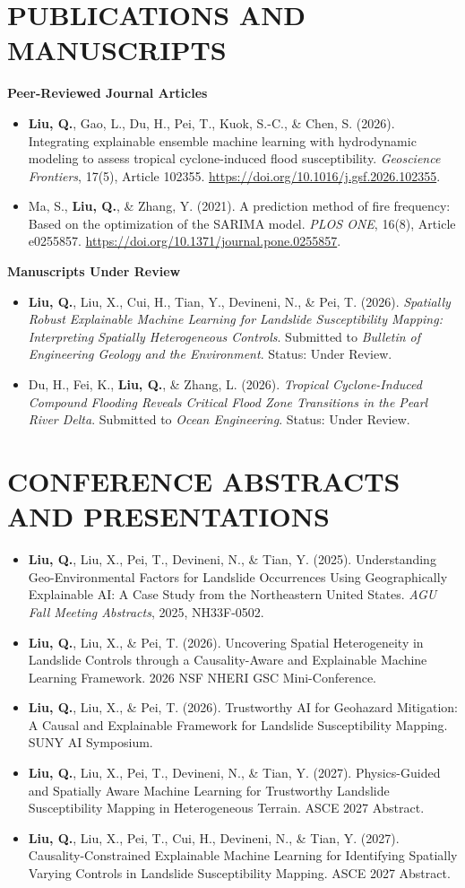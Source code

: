 \documentclass[10pt,letterpaper]{article}
\newcommand{\publication}[1]{\item \justifying #1}
\begin{document}
\section*{PUBLICATIONS AND MANUSCRIPTS}
\textbf{Peer-Reviewed Journal Articles}
\begin{itemize}
    \publication{\textbf{Liu, Q.}, Gao, L., Du, H., Pei, T., Kuok, S.-C., \& Chen, S. (2026). Integrating explainable ensemble machine learning with hydrodynamic modeling to assess tropical cyclone-induced flood susceptibility. \textit{Geoscience Frontiers}, 17(5), Article 102355. \href{https://doi.org/10.1016/j.gsf.2026.102355}{https://doi.org/10.1016/j.gsf.2026.102355}.}
    \publication{Ma, S., \textbf{Liu, Q.}, \& Zhang, Y. (2021). A prediction method of fire frequency: Based on the optimization of the SARIMA model. \textit{PLOS ONE}, 16(8), Article e0255857. \href{https://doi.org/10.1371/journal.pone.0255857}{https://doi.org/10.1371/journal.pone.0255857}.}
\end{itemize}
\textbf{Manuscripts Under Review}
\begin{itemize}
    \publication{\textbf{Liu, Q.}, Liu, X., Cui, H., Tian, Y., Devineni, N., \& Pei, T. (2026). \textit{Spatially Robust Explainable Machine Learning for Landslide Susceptibility Mapping: Interpreting Spatially Heterogeneous Controls}. Submitted to \textit{Bulletin of Engineering Geology and the Environment}. Status: Under Review.}
    \publication{Du, H., Fei, K., \textbf{Liu, Q.}, \& Zhang, L. (2026). \textit{Tropical Cyclone-Induced Compound Flooding Reveals Critical Flood Zone Transitions in the Pearl River Delta}. Submitted to \textit{Ocean Engineering}. Status: Under Review.}
\end{itemize}

\section*{CONFERENCE ABSTRACTS AND PRESENTATIONS}
\begin{itemize}
    \publication{\textbf{Liu, Q.}, Liu, X., Pei, T., Devineni, N., \& Tian, Y. (2025). Understanding Geo-Environmental Factors for Landslide Occurrences Using Geographically Explainable AI: A Case Study from the Northeastern United States. \textit{AGU Fall Meeting Abstracts}, 2025, NH33F-0502.}
    \publication{\textbf{Liu, Q.}, Liu, X., \& Pei, T. (2026). Uncovering Spatial Heterogeneity in Landslide Controls through a Causality-Aware and Explainable Machine Learning Framework. 2026 NSF NHERI GSC Mini-Conference.}
    \publication{\textbf{Liu, Q.}, Liu, X., \& Pei, T. (2026). Trustworthy AI for Geohazard Mitigation: A Causal and Explainable Framework for Landslide Susceptibility Mapping. SUNY AI Symposium.}
    \publication{\textbf{Liu, Q.}, Liu, X., Pei, T., Devineni, N., \& Tian, Y. (2027). Physics-Guided and Spatially Aware Machine Learning for Trustworthy Landslide Susceptibility Mapping in Heterogeneous Terrain. ASCE 2027 Abstract.}
    \publication{\textbf{Liu, Q.}, Liu, X., Pei, T., Cui, H., Devineni, N., \& Tian, Y. (2027). Causality-Constrained Explainable Machine Learning for Identifying Spatially Varying Controls in Landslide Susceptibility Mapping. ASCE 2027 Abstract.}
\end{itemize}
\end{document}
